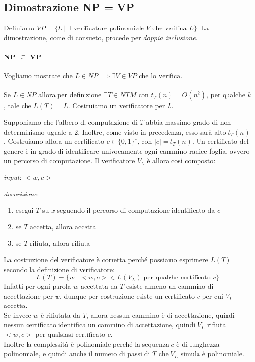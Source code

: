 \subsection{Dimostrazione NP = VP}

Definiamo $VP = \{ L \ | \ \exists \text{ verificatore polinomiale } V \text{ che verifica } L \}$. La dimostrazione, come di consueto, procede per \textit{doppia inclusione}.


\paragraph{NP $\subseteq$ VP}

Vogliamo mostrare che $L \in NP \implies \exists V \in VP \text{ che lo verifica}$.
\\
\\
Se $L \in NP$ allora per definizione $\exists T \in NTM$ con $t_T(n) = O(n^k)$, per qualche $k$, tale che $L(T) = L$. Costruiamo un verificatore per $L$.

Supponiamo che l'albero di computazione di $T$ abbia massimo grado di non determinismo uguale a 2. Inoltre, come visto in precedenza, esso sarà alto $t_T(n)$.
Costruiamo allora un certificato $c \in \{ 0, 1 \}^{\star}$, con $|c| = t_T(n)$. Un certificato del genere è in grado di identificare univocamente ogni cammino radice foglia, ovvero un percorso di computazione. Il verificatore $V_L$ è allora così composto:
\begin{description}
	\item \textit{input}: $<w, c>$
	\item \textit{descrizione}:
	\begin{enumerate}
		\item esegui $T$ su $x$ seguendo il percorso di computazione identificato da $c$
		\item se $T$ accetta, allora accetta
		\item se $T$ rifiuta, allora rifiuta
	\end{enumerate}
\end{description}

La costruzione del verificatore è corretta perché possiamo esprimere $L(T)$ secondo la definizione di verificatore:
\[
	L(T) = \{w \ |\ <w, c > \in L(V_L) \text{ per qualche certificato } c \}
\]
Infatti per ogni parola $w$ accettata da $T$ esiste almeno un cammino di accettazione per $w$, dunque per costruzione esiste un
certificato $c$ per cui $V_L$ accetta. 
\\
Se invece $w$ è rifiutata da $T$, allora nessun cammino è di accettazione, quindi nessun certificato identifica un cammino di accettazione, quindi $V_L$ rifiuta $<w, c>$ per qualsiasi certificato $c$.
\\
Inoltre la complessità è polinomiale perché la sequenza $c$ è di lunghezza polinomiale, e quindi anche il numero di passi di $T$ che $V_L$ simula è polinomiale.

